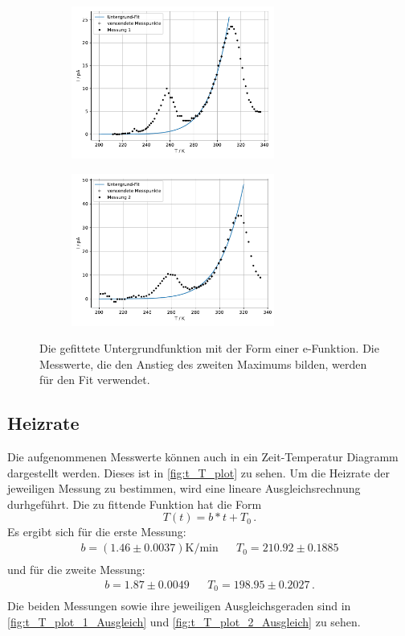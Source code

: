 \begin{figure}
  \begin{subfigure}[b]{.5\linewidth}
    \centering
    \includegraphics[height=5cm, keepaspectratio]{build/untergrund_1.pdf}
  \end{subfigure}
  
  \begin{subfigure}[b]{.5\linewidth}
    \centering
    \includegraphics[height=5cm, keepaspectratio]{build/untergrund_2.pdf}
  \end{subfigure}
  
  \caption{Die gefittete Untergrundfunktion mit der Form einer e-Funktion.
    Die Messwerte, die den Anstieg des zweiten Maximums bilden, werden für den Fit verwendet.}
  \label{fig:T_I_plot_Untergrund}
\end{figure} %

\subsection{Heizrate}
  Die aufgenommenen Messwerte können auch in ein Zeit-Temperatur Diagramm dargestellt werden.
  Dieses ist in \autoref{fig:t_T_plot} zu sehen.
  Um die Heizrate der jeweiligen Messung zu bestimmen, wird eine lineare Ausgleichsrechnung durhgeführt.
  Die zu fittende Funktion hat die Form
  \begin{equation*}
    T(t) = b * t + T_0 \, .
  \end{equation*}
  Es ergibt sich für die erste Messung:
  \begin{align*}
    b = (1.46 \pm 0.0037) \si{\kelvin\per\minute} &&  T_0 = 210.92 \pm 0.1885\\
  \end{align*}
  und für die zweite Messung:
  \begin{align*}
    b =  1.87 \pm 0.0049  &&  T_0 = 198.95 \pm  0.2027 \, . \\
  \end{align*}
  Die beiden Messungen sowie ihre jeweiligen Ausgleichsgeraden sind in \autoref{fig:t_T_plot_1_Ausgleich} und \autoref{fig:t_T_plot_2_Ausgleich} zu sehen.

